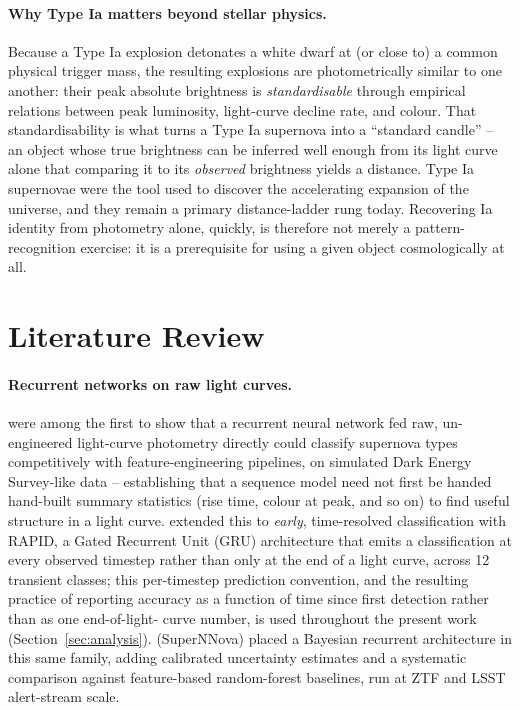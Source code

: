\paragraph{Why Type Ia matters beyond stellar physics.}
Because a Type Ia explosion detonates a white dwarf at (or close to) a
common physical trigger mass, the resulting explosions are photometrically
similar to one another: their peak absolute brightness is
\emph{standardisable} through empirical relations between peak luminosity,
light-curve decline rate, and colour. That standardisability is what turns
a Type Ia supernova into a ``standard candle'' -- an object whose true
brightness can be inferred well enough from its light curve alone that
comparing it to its \emph{observed} brightness yields a distance. Type Ia
supernovae were the tool used to discover the accelerating expansion of the
universe, and they remain a primary distance-ladder rung today. Recovering
Ia identity from photometry alone, quickly, is therefore not merely a
pattern-recognition exercise: it is a prerequisite for using a given object
cosmologically at all.

\section{Literature Review}
\label{sec:literature}

\paragraph{Recurrent networks on raw light curves.}
\citet{charnock2017} were among the first to show that a recurrent neural
network fed raw, un-engineered light-curve photometry directly could
classify supernova types competitively with feature-engineering pipelines,
on simulated Dark Energy Survey-like data -- establishing that a sequence
model need not first be handed hand-built summary statistics (rise time,
colour at peak, and so on) to find useful structure in a light curve.
\citet{muthukrishna2019rapid} extended this to \emph{early}, time-resolved
classification with RAPID, a Gated Recurrent Unit (GRU) architecture that
emits a classification at every observed timestep rather than only at the
end of a light curve, across 12 transient classes; this per-timestep
prediction convention, and the resulting practice of reporting accuracy as
a function of time since first detection rather than as one end-of-light-
curve number, is used throughout the present work (Section~\ref{sec:analysis}).
\citet{moller2020supernnova} (SuperNNova) placed a Bayesian recurrent
architecture in this same family, adding calibrated uncertainty estimates
and a systematic comparison against feature-based random-forest baselines,
run at ZTF and LSST alert-stream scale.

